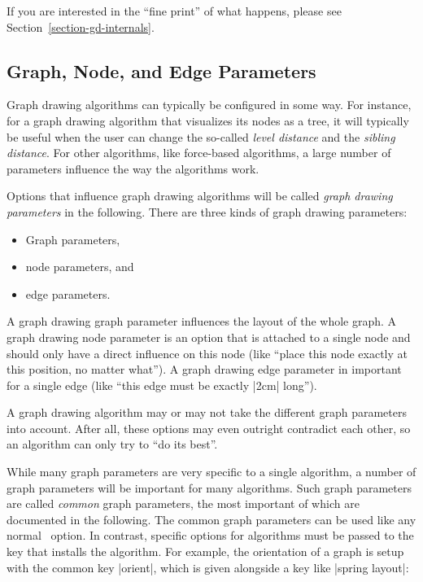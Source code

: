 If you are interested in the ``fine print'' of what happens, please
see Section~\ref{section-gd-internals}.



\subsection{Graph, Node, and Edge Parameters}

Graph drawing algorithms can typically be configured in some way. For
instance, for a graph drawing algorithm that visualizes its nodes as a
tree, it will typically be useful when the user can change the
so-called \emph{level distance} and the \emph{sibling distance}. For
other algorithms, like force-based algorithms, a large number of
parameters influence the way the algorithms work.

Options that influence graph drawing algorithms will be called
\emph{graph drawing parameters} in the following. There are three kinds of
graph drawing parameters:
\begin{itemize}
\item Graph parameters,
\item node parameters, and
\item edge parameters.
\end{itemize}
A graph drawing graph parameter influences the layout of the whole
graph. A graph drawing node parameter is an option that is attached to
a single node and should only have a direct influence on this node
(like ``place this node exactly at this position, no matter what''). A
graph drawing edge parameter in important for a single edge (like
``this edge must be exactly |2cm| long'').

A graph drawing algorithm may or may not take the different graph
parameters into account. After all, these options may even outright
contradict each other, so an algorithm can only try to ``do its
best''.

While many graph parameters are very specific to a single algorithm, a
number of graph parameters will be important for many algorithms. Such
graph parameters are called \emph{common} graph parameters, the most
important of which are documented in the following. The common graph
parameters can be used like any normal \tikzname\ option. In contrast,
specific options for algorithms must be passed to the key that
installs the algorithm. For example, the orientation of a graph
is setup with the common key |orient|, which is given alongside a key
like |spring layout|:

